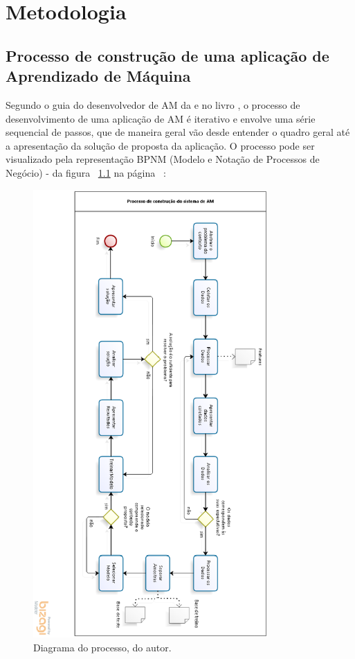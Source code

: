 \chapter{Metodologia}
\section{Processo de construção de uma aplicação de Aprendizado de Máquina}

Segundo o guia do desenvolvedor de AM da \cite{Amazon} e no livro \cite{geron2017hands}, o processo de desenvolvimento de uma aplicação de AM é iterativo e envolve uma série sequencial de passos, que de maneira geral vão desde entender o quadro geral até a apresentação da solução de proposta da aplicação. O processo pode ser visualizado pela representação BPNM (Modelo e Notação de Processos de Negócio) - da figura ~\ref{ProcessoAM} na página ~\pageref{ProcessoAM}:

\begin{figure}[!htb]
	\centering
	\includegraphics[width=0.8\textwidth]{figuras/ProcessoAM.eps}
	\caption{Diagrama do processo, do autor.}
	\label{ProcessoAM}
\end{figure}

